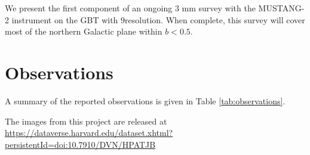 \documentclass[twocolumn]{aastex62}
\newcommand{\MUSTANG}{MUSTANG-2\xspace}
\begin{document}

We present the first component of an ongoing 3 mm survey with the \MUSTANG instrument on the GBT with 9\arcsec resolution.   When complete, this survey will cover most of the northern Galactic plane within $b<0.5$.


\section{Observations}

A summary of the reported observations is given in Table \ref{tab:observations}.

The images from this project are released at
\url{https://dataverse.harvard.edu/dataset.xhtml?persistentId=doi:10.7910/DVN/HPATJB}
\end{document}
